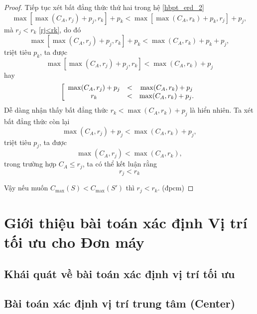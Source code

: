 \documentclass[12pt,a4paper]{report}
\begin{document}
\begin{proof}
	Tiếp tục xét bất đẳng thức thứ hai trong hệ \eqref{hbpt_erd_2}
	\begin{equation}
		\max \left[ \max (C_A, r_j) + p_j, r_k \right] + p_k < \max \left[ \max (C_A, r_k) + p_k, r_j \right] + p_j,
	\end{equation}
	mà $r_j<r_k$ \eqref{rj<rk}, do đó
	\begin{equation}
		\max \left[ \max (C_A, r_j) + p_j, r_k \right] + p_k < \max (C_A, r_k) + p_k + p_j,
	\end{equation}
	triệt tiêu $p_k$, ta được
	\begin{equation}
		\max \left[ \max (C_A, r_j) + p_j, r_k \right] < \max (C_A, r_k) + p_j
	\end{equation}
	hay
	\begin{equation}
		\left[
			\begin{array}{c c c}
				\max (C_A, r_j) + p_j &<& \max (C_A, r_k) + p_j \\
				r_k &<& \max (C_A, r_k) + p_j.
			\end{array}
		\right.
	\end{equation}
	Dễ dàng nhận thấy bất đẳng thức $r_k < \max (C_A, r_k) + p_j$ là hiển nhiên. Ta xét bất đẳng thức còn lại
	\begin{equation}
			\max (C_A, r_j) + p_j < \max (C_A, r_k) + p_j,
	\end{equation}
	triệt tiêu $p_j$, ta được
	\begin{equation}
			\max (C_A, r_j) < \max (C_A, r_k),
	\end{equation}
	trong trường hợp $C_A \leq r_j$, ta có thể kết luận rằng
	\begin{equation}
			r_j < r_k
	\end{equation}

	Vậy nếu muốn $C_{\max}(S) < C_{\max}(S')$ thì $r_j < r_k$. (đpcm)
\end{proof}

\phantom{text}

\phantom{text}

\chapter{Giới thiệu bài toán xác định Vị trí tối ưu cho Đơn máy}

\section{Khái quát về bài toán xác định vị trí tối ưu}

\section{Bài toán xác định vị trí trung tâm (Center)}
\end{document}
